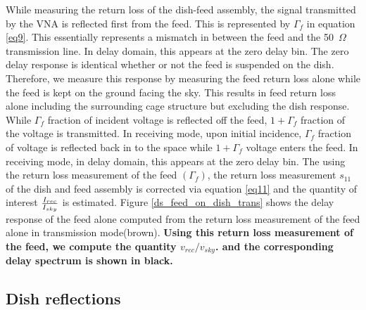 \documentclass[twocolumn]{emulateapj}
\begin{document}
     While measuring the return loss
    of the dish-feed assembly, the signal transmitted by the VNA is reflected first
    from the feed. This is represented by $\Gamma_{f}$ in equation \ref{eq9}. This
    essentially represents a mismatch in between the feed and the 50~$\Omega$
    transmission line. In delay domain, this appears at the zero delay bin. The
    zero delay response is identical whether or not the feed is suspended on the
    dish. Therefore, we measure this response by measuring the feed return loss
    alone while the feed is kept on the ground facing the sky. This results in feed
    return loss alone including the surrounding cage structure but excluding the
    dish response. While $\Gamma_{f}$ fraction of incident voltage is reflected off
    the feed, $1+\Gamma_{f}$ fraction of the voltage is transmitted. In receiving
    mode, upon initial incidence, $\Gamma_{f}$ fraction of voltage is reflected
    back in to the space while $1+\Gamma_{f}$ voltage enters the feed. In receiving
    mode, in delay domain, this appears at the zero delay bin.  The using the
    return loss measurement of the feed $(\Gamma_{f})$, the return loss measurement
    $s_{11}$ of the dish and feed assembly is corrected via equation \ref{eq11} and
    the quantity of interest ${I_{rec}\over I_{sky}}$ is estimated. Figure \ref{ds_feed_on_dish_trans}
    shows the delay response of the feed alone computed from the return loss measurement of the feed alone in 
    transmission mode(brown). \textbf{Using this return loss measurement of the feed, we compute the quantity $v_{rec}/v_{sky}$. 
    and the corresponding delay spectrum is shown in black. }
    
    
    \subsection{Dish reflections}
    
\end{document}

